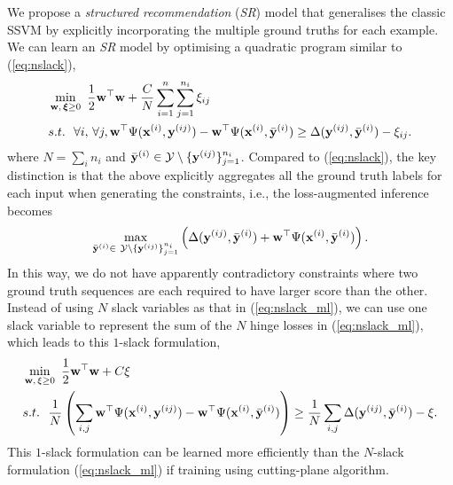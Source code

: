 We propose a \emph{structured recommendation} (\emph{SR}) model that generalises the classic SSVM by explicitly incorporating the multiple ground truths for each example.
We can learn an \emph{SR} model by optimising a quadratic program similar to (\ref{eq:nslack}),
\begin{equation}
\label{eq:nslack_ml}
\begin{aligned}
&\min_{\mathbf{w}, \, \bm{\xi} \ge 0} ~ \frac{1}{2} \mathbf{w}^\top \mathbf{w} + \frac{C}{N} \sum_{i=1}^n \sum_{j=1}^{n_i} \xi_{ij} \\
&s.t.~~ \forall i, \, \forall j, 
  \mathbf{w}^\top \Psi(\mathbf{x}^{(i)}, \mathbf{y}^{(ij)}) - \mathbf{w}^\top \Psi(\mathbf{x}^{(i)}, \bar{\mathbf{y}}^{(i)}) \ge
  \Delta(\mathbf{y}^{(ij)}, \bar{\mathbf{y}}^{(i)}) - \xi_{ij}.
\end{aligned}
\end{equation}
where $N = \sum_i n_i$ and $\bar{\mathbf{y}}^{(i)} \in \mathcal{Y} \setminus \{\mathbf{y}^{(ij)}\}_{j=1}^{n_i}$.
Compared to (\ref{eq:nslack}), the key distinction is that the above
explicitly aggregates all the ground truth labels for each input when generating the constraints,
i.e., the loss-augmented inference becomes
\begin{equation}
\label{eq:loss_aug_inf}
\max_{\bar{\mathbf{y}}^{(i)} \in \ \mathcal{Y} \setminus \{\mathbf{y}^{(ij)}\}_{j=1}^{n_i}}
     \left( \Delta(\mathbf{y}^{(ij)}, \bar{\mathbf{y}}^{(i)}) + \mathbf{w}^\top \Psi(\mathbf{x}^{(i)}, \bar{\mathbf{y}}^{(i)}) \right).
\end{equation}
In this way, we do not have apparently contradictory constraints where
two ground truth sequences are each required to have larger score than the other.
Instead of using $N$ slack variables as that in (\ref{eq:nslack_ml}),
we can use one slack variable to represent the sum of the $N$ hinge losses in (\ref{eq:nslack_ml}),
which leads to this $1$-slack formulation,
\begin{equation}
\label{eq:1slack_ml}
\begin{aligned}
& \min_{\mathbf{w}, \, \xi \ge 0} ~\frac{1}{2} \mathbf{w}^\top \mathbf{w} + C \xi \\
& s.t.~~ \frac{1}{N} \left( \sum_{i,j} \mathbf{w}^\top \Psi(\mathbf{x}^{(i)}, \mathbf{y}^{(ij)}) - \mathbf{w}^\top \Psi(\mathbf{x}^{(i)}, \bar{\mathbf{y}}^{(i)}) \right) 
  \ge \frac{1}{N} \sum_{i,j} \Delta(\mathbf{y}^{(ij)}, \bar{\mathbf{y}}^{(i)}) - \xi.
\end{aligned}
\end{equation}
This $1$-slack formulation can be learned more efficiently than the $N$-slack formulation (\ref{eq:nslack_ml}) if training using cutting-plane algorithm.

